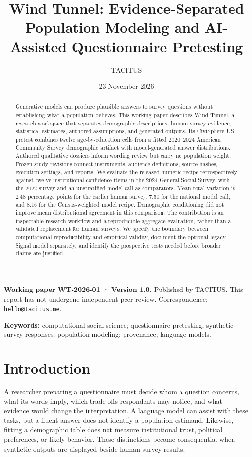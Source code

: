 \documentclass[
  11pt,
]{article}
\title{Wind Tunnel: Evidence-Separated Population Modeling and
AI-Assisted Questionnaire Pretesting}
\author{TACITUS}
\date{23 November 2026}
\let\originalsection\section
\renewcommand{\section}{\Needspace{5\baselineskip}\originalsection}
\begin{document}
\maketitle
\begin{abstract}
Generative models can produce plausible answers to survey questions
without establishing what a population believes. This working paper
describes Wind Tunnel, a research workspace that separates demographic
descriptions, human survey evidence, statistical estimates, authored
assumptions, and generated outputs. Its CiviSphere US pretest combines
twelve age-by-education cells from a fitted 2020--2024 American
Community Survey demographic artifact with model-generated answer
distributions. Authored qualitative dossiers inform wording review but
carry no population weight. Frozen study revisions connect instruments,
audience definitions, source hashes, execution settings, and reports. We
evaluate the released numeric recipe retrospectively against twelve
institutional-confidence items in the 2024 General Social Survey, with
the 2022 survey and an unstratified model call as comparators. Mean
total variation is 2.48 percentage points for the earlier human survey,
7.50 for the national model call, and 8.16 for the Census-weighted model
recipe. Demographic conditioning did not improve mean distributional
agreement in this comparison. The contribution is an inspectable
research workflow and a reproducible aggregate evaluation, rather than a
validated replacement for human surveys. We specify the boundary between
computational reproducibility and empirical validity, document the
optional legacy Signal model separately, and identify the prospective
tests needed before broader claims are justified.
\end{abstract}

\textbf{Working paper WT-2026-01 · Version 1.0.} Published by TACITUS.
This report has not undergone independent peer review. Correspondence:
\href{mailto:hello@tacitus.me}{\nolinkurl{hello@tacitus.me}}.

\textbf{Keywords:} computational social science; questionnaire
pretesting; synthetic survey responses; population modeling; provenance;
language models.

\section{Introduction}\label{introduction}

A researcher preparing a questionnaire must decide whom a question
concerns, what its words imply, which trade-offs respondents may notice,
and what evidence would change the interpretation. A language model can
assist with these tasks, but a fluent answer does not identify a
population estimand. Likewise, fitting a demographic table does not
measure institutional trust, political preferences, or likely behavior.
These distinctions become consequential when synthetic outputs are
displayed beside human survey results.
\end{document}
